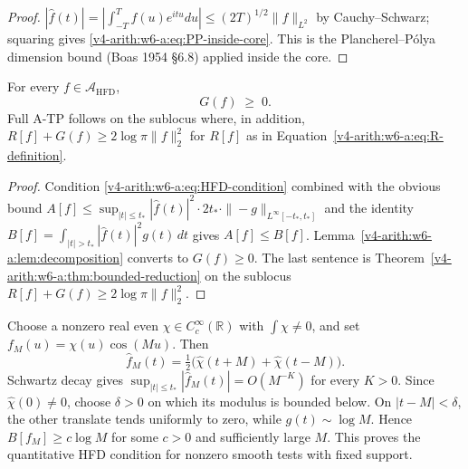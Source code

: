 \begin{proof}
\(|\widehat{f}(t)|=|\int_{-T}^{T}f(u)e^{itu}du|\leq(2T)^{1/2}\|f\|_{L^{2}}\)
by Cauchy--Schwarz; squaring gives
\eqref{v4-arith:w6-a:eq:PP-inside-core}. This is the
Plancherel--P\'olya dimension bound (Boas 1954 \S6.8) applied inside
the core.
\end{proof}

\begin{theorem}
\label{v4-arith:w6-a:thm:HFD-ATP}
For every \(f\in\mathscr A_{\mathrm{HFD}}\),
\begin{equation}
\label{v4-arith:w6-a:eq:HFD-ATP-conclusion}
G(f)\;\geq\;0.
\end{equation}
Full A-TP follows on the sublocus where, in addition,
\(R[f]+G(f)\geq2\log\pi\|f\|_2^2\) for \(R[f]\) as in
Equation~\ref{v4-arith:w6-a:eq:R-definition}.
\end{theorem}

\begin{proof}
Condition \eqref{v4-arith:w6-a:eq:HFD-condition} combined with the
obvious bound
\(A[f]\leq\sup_{|t|\leq t_{\ast}}|\widehat{f}(t)|^{2}\cdot 2t_{\ast}\cdot\|{-}g\|_{L^{\infty}[-t_{\ast},t_{\ast}]}\)
and the identity \(B[f]=\int_{|t|>t_{\ast}}|\widehat{f}(t)|^{2}g(t)\,dt\)
gives \(A[f]\leq B[f]\). Lemma~\ref{v4-arith:w6-a:lem:decomposition} converts
to \(G(f)\geq 0\). The last sentence is
Theorem~\ref{v4-arith:w6-a:thm:bounded-reduction} on the sublocus
\(R[f]+G(f)\geq2\log\pi\|f\|_2^2\).
\end{proof}

\begin{remark}
\label{v4-arith:w6-a:rem:HFD-nonempty}
Choose a nonzero real even \(\chi\in C_c^\infty(\mathbb R)\)
with \(\int\chi\ne0\), and set \(f_M(u)=\chi(u)\cos(Mu)\).
Then
\begin{equation}
\label{v4-arith:w6-a:eq:HFD-concentration}
 \widehat f_M(t)=\tfrac12\bigl(\widehat\chi(t+M)+\widehat\chi(t-M)\bigr).
\end{equation}
Schwartz decay gives
\(\sup_{|t|\leq t_*}|\widehat f_M(t)|=O(M^{-K})\) for every
\(K>0\). Since \(\widehat\chi(0)\ne0\), choose \(\delta>0\)
on which its modulus is bounded below. On \(|t-M|<\delta\),
the other translate tends uniformly to zero, while
\(g(t)\sim\log M\). Hence \(B[f_M]\geq c\log M\) for some
\(c>0\) and sufficiently large \(M\). This proves the quantitative
HFD condition for nonzero smooth tests with fixed support.
\end{remark}

